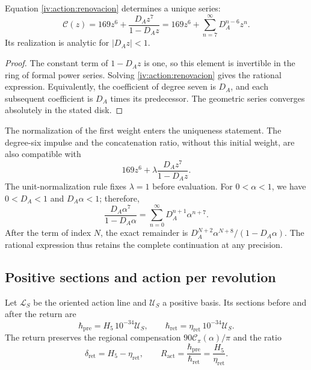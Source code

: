 \begin{proposition}
\label{iv:action:unicidad-renovacion}
Equation \eqref{iv:action:renovacion} determines a unique series:
\begin{equation}
 \mathscr C(z)=169z^6+\frac{D_Az^7}{1-D_Az}
             =169z^6+\sum_{n=7}^{\infty}D_A^{n-6}z^n.
 \label{iv:action:serie-renovacion}
\end{equation}
Its realization is analytic for \(|D_Az|<1\).
\end{proposition}
\begin{proof}
The constant term of \(1-D_Az\) is one, so this element is
invertible in the ring of formal power series.
Solving \eqref{iv:action:renovacion} gives the rational expression.
Equivalently, the coefficient of degree seven is \(D_A\), and
each subsequent coefficient is \(D_A\) times its predecessor.
The geometric series converges absolutely in the stated disk.
\end{proof}

The normalization of the first weight enters the uniqueness statement.
The degree-six impulse and the concatenation ratio, without this
initial weight, are also compatible with
\[
 169z^6+\lambda\frac{D_Az^7}{1-D_Az}.
\]
The unit-normalization rule fixes \(\lambda=1\) before evaluation.
For \(0<\alpha<1\), we have \(0<D_A<1\) and \(D_A\alpha<1\);
therefore,
\begin{equation}
 \frac{D_A\alpha^7}{1-D_A\alpha}
   =\sum_{n=0}^{\infty}D_A^{n+1}\alpha^{n+7}.
 \label{iv:action:cola}
\end{equation}
After the term of index \(N\), the exact remainder is
\(D_A^{N+2}\alpha^{N+8}/(1-D_A\alpha)\). The rational expression
thus retains the complete continuation at any precision.

\subsection{Positive sections and action per revolution}
\label{iv:action:secciones}

Let \(\mathcal L_S\) be the oriented action line and
\(\mathcal U_S\) a positive basis. Its sections before and
after the return are
\begin{equation}
 \hbar_{\mathrm{pre}}=H_5\,10^{-34}\mathcal U_S,\qquad
 \hbar_{\mathrm{ret}}=\eta_{\mathrm{ret}}\,10^{-34}\mathcal U_S.
 \label{iv:action:hbar}
\end{equation}
The return preserves the regional compensation
\(90\mathcal C_\pi(\alpha)/\pi\) and the ratio
\begin{equation}
 \delta_{\mathrm{ret}}=H_5-\eta_{\mathrm{ret}},\qquad
 R_{\mathrm{act}}=\frac{\hbar_{\mathrm{pre}}}
                        {\hbar_{\mathrm{ret}}}
                =\frac{H_5}{\eta_{\mathrm{ret}}}.
 \label{iv:action:razon}
\end{equation}

